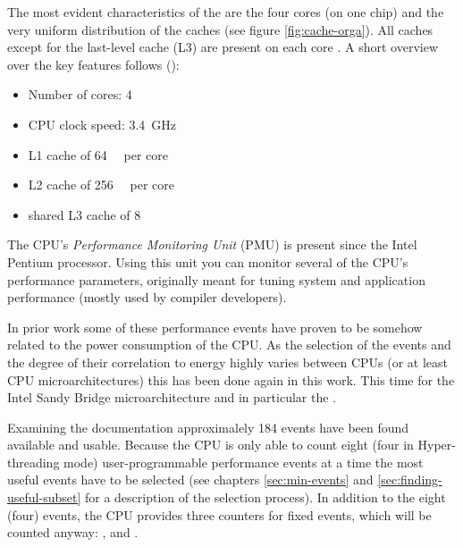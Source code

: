 The most evident characteristics of the \JWPcpu{} are the four cores (on one
chip) and the very uniform distribution of the caches (see figure
\ref{fig:cache-orga}). All caches except for the last-level cache (L3) are
present on each core \cite{fog11}. A short overview over the key features
follows (\cite{intel2011spec}):

\begin{itemize}

\item Number of cores: 4

\item CPU clock speed: \SI{3.4}{\giga\hertz}

\item L1 cache of \SI{64}{\kibi\byte} per core\cite{intel2011softdev1}

\item L2 cache of \SI{256}{\kibi\byte} per core\cite{intel2011softdev1}

\item shared L3 cache of \SI{8}{\mebi\byte}\cite{intel2011softdev1}

\end{itemize}


\label{sec:pmu}

The CPU's \emph{Performance Monitoring Unit} (PMU) is present since the
Intel\TReg{} Pentium processor. Using this unit you can monitor several of the
CPU's performance parameters, originally meant for tuning system and application
performance \cite{intel2011softdev3b} (mostly used by compiler developers).

In prior work \cite{bellosa2000benefits,snowdon2010operating,
weissel2002process,kellner03tempcontrol,bertran2010decomposable} some of these
performance events have proven to be somehow related to the power consumption of
the CPU. As the selection of the events and the degree of their correlation to
energy highly varies between CPUs (or at least CPU microarchitectures) this has
been done again in this work. This time for the Intel\TReg{} Sandy Bridge
microarchitecture and in particular the \JWPcpu{}.

Examining the documentation \cite{intel2011events} approximalely 184 events have
been found available and usable. Because the CPU is only able to count eight
(four in Hyper-threading \cite{wiki:HT} mode) user-programmable performance
events at a time \cite{intel2011softdev1} the most useful events have to be
selected (see chapters \ref{sec:min-events} and \ref{sec:finding-useful-subset}
for a description of  the selection process). In addition to the eight (four)
events, the CPU provides three counters for fixed events, which will be counted
anyway: , 
and .

